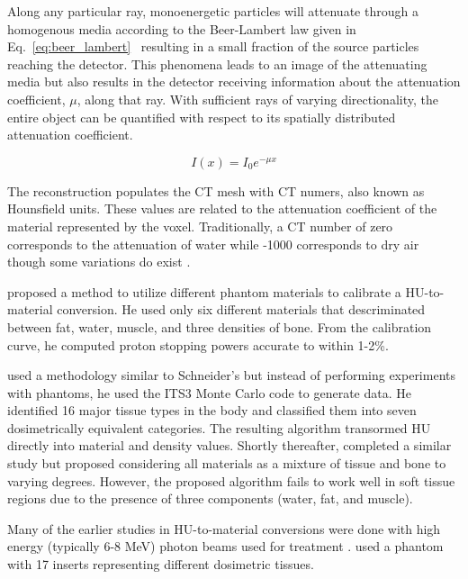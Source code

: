 Along any particular ray, monoenergetic particles will attenuate through a homogenous media according to the Beer-Lambert law given in Eq.~\ref{eq:beer_lambert}~\citep{ref:lamarshj} resulting in a small fraction of the source particles reaching the detector. This phenomena leads to an image of the attenuating media but also results in the detector receiving information about the attenuation coefficient, $\mu$, along that ray. With sufficient rays of varying directionality, the entire object can be quantified with respect to its spatially distributed attenuation coefficient. 

\begin{equation}\label{eq:beer_lambert}
I(x) = I_0 e^{-\mu x}
\end{equation}

The reconstruction populates the CT mesh with CT numers, also known as Hounsfield units. These values are related to the attenuation coefficient of the material represented by the voxel. Traditionally, a CT number of zero corresponds to the attenuation of water while -1000 corresponds to dry air though some variations do exist \citep{ref:plessisf,ref:sawc}.

\citet{ref:schneideru} proposed a method to utilize different phantom materials to calibrate a HU-to-material conversion. He used only six different materials that descriminated between fat, water, muscle, and three densities of bone. From the calibration curve, he computed proton stopping powers accurate to within 1-2\%.

\citet{ref:plessisf} used a methodology similar to Schneider's but instead of performing experiments with phantoms, he used the ITS3 \citep{ref:halbleibj} Monte Carlo code to generate data. He identified 16 major tissue types in the body and classified them into seven dosimetrically equivalent categories. The resulting algorithm transormed HU directly into material and density values. Shortly thereafter, \citet{ref:schneiderw} completed a similar study but proposed considering all materials as a mixture of tissue and bone to varying degrees. However, the proposed algorithm fails to work well in soft tissue regions due to the presence of three components (water, fat, and muscle).

Many of the earlier studies in HU-to-material conversions were done with high energy (typically 6-8 MeV) photon beams used for treatment \citep{ref:kimh} \citep{ref:vanderstraetenb}. \citet{ref:sawc} used a phantom with 17 inserts representing different dosimetric tissues.

